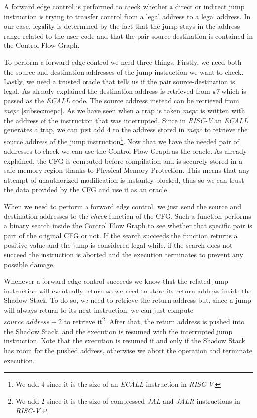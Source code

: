 A forward edge control is performed to check whether a direct or indirect jump
instruction is trying to transfer control from a legal address to a legal
address. In our case, legality is determined by the fact that the jump stays in
the address range related to the user code and that the pair source destination
is contained in the Control Flow Graph.

To perform a forward edge control we need three things. Firstly, we need both
the source and destination addresses of the jump instruction we want to check. Lastly,
we need a trusted oracle that tells us if the pair source-destination is legal. As
already explained the destination address is retrieved from \textit{a7} which is
passed as the \textit{ECALL} code. The source address instead can be retrieved
from \textit{mepc} \ref{subsec:mepc}. As we have seen when a trap is taken
\textit{mepc} is written with the address of the instruction that was interrupted.
Since in \textit{RISC-V} an \textit{ECALL} generates a trap, we can just add $4$
to the address stored in \textit{mepc} to retrieve the source address of the
jump instruction\footnote{We add $4$ since it is the size of an \textit{ECALL} instruction
in \textit{RISC-V}.}. Now that we have the needed pair of addresses to check we
can use the Control Flow Graph as the oracle. As already explained, the CFG is
computed before compilation and is securely stored in a safe memory region
thanks to Physical Memory Protection. This means that any attempt of unauthorized
modification is instantly blocked, thus so we can trust the data provided by the
CFG and use it as an oracle.

When we need to perform a forward edge control, we just send the source and destination
addresses to the \textit{check} function of the CFG. Such a function performs a binary
search inside the Control Flow Graph to see whether that specific pair is part of
the original CFG or not. If the search succeeds the function returns a positive
value and the jump is considered legal while, if the search does not succeed the
instruction is aborted and the execution terminates to prevent any possible damage.

Whenever a forward edge control succeeds we know that the related jump instruction
will eventually return so we need to store its return address inside the Shadow Stack.
To do so, we need to retrieve the return address but, since a jump will always
return to its next instruction, we can just compute $\textit{source address}+ 2$
to retrieve it\footnote{We add $2$ since it is the size of compressed \textit{JAL}
and \textit{JALR} instructions in \textit{RISC-V}.}. After that, the return
address is pushed into the Shadow Stack, and the execution is resumed with the interrupted
jump instruction. Note that the execution is resumed if and only if the Shadow
Stack has room for the pushed address, otherwise we abort the operation and terminate
execution.

